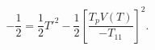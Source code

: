 \begin{equation}\label{tpa}
-\frac{1}{2}=\frac{1}{2}T'^{2}-\frac{1}{2}\left
[\frac{T_{p}V(T)}{-T_{11}}\right]^{2}.
\end{equation}

